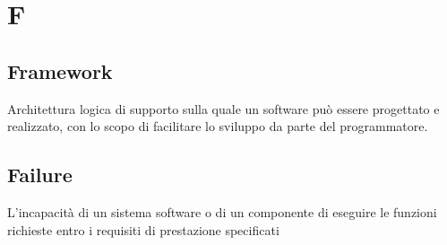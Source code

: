 \section{F}
\subsection{Framework}%
Architettura logica di supporto sulla quale un software può essere progettato e realizzato, con lo scopo di facilitare lo sviluppo da parte del programmatore.
\subsection{Failure}%
L'incapacità di un sistema software o di un componente di eseguire le funzioni richieste entro i requisiti di prestazione specificati
\clearpage